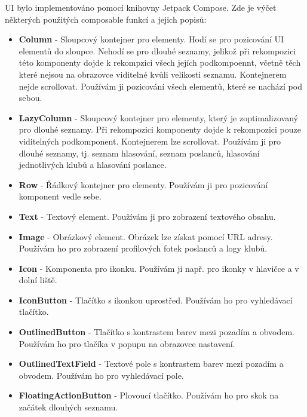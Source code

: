 UI bylo implementováno pomocí knihovny Jetpack Compose. Zde je výčet některých použitých composable funkcí a jejich popisů:


\begin{itemize}
	\item \textbf{Column} - Sloupcový kontejner pro elementy. Hodí se pro pozicování UI elementů do sloupce. Nehodí se pro dlouhé seznamy, jelikož při rekompozici této komponenty dojde k rekompzici všech jejích podkompoennt, včetně těch které nejsou na obrazovce viditelné kvůli velikosti seznamu. Kontejnerem nejde scrollovat. Používám ji pozicování všech elementů, které se nachází pod sebou.

	\item \textbf{LazyColumn} - Sloupcový kontejner pro elementy, který je zoptimalizovaný pro dlouhé seznamy. Při rekompozici komponenty dojde k rekompozici pouze viditelných podkomponent. Kontejnerem lze scrollovat. Používám ji pro dlouhé seznamy, tj. seznam hlasování, seznam poslanců, hlasování jednotlivých klubů a hlasování poslance.

	\item \textbf{Row} - Řádkový kontejner pro elementy. Používám ji pro pozicování komponent vedle sebe.

	\item \textbf{Text} - Textový element. Používám ji pro zobrazení textového obsahu.

	\item \textbf{Image} - Obrázkový element. Obrázek lze získat pomocí URL adresy. Používám ho pro zobrazení profilových fotek poslanců a logy klubů.

	\item \textbf{Icon} - Komponenta pro ikonku. Používám ji např. pro ikonky v hlavičce a v dolní liště.

	\item \textbf{IconButton} - Tlačítko s ikonkou uprostřed. Používám ho pro vyhledávací tlačítko.

	\item \textbf{OutlinedButton} - Tlačítko s kontrastem barev mezi pozadím a obvodem. Používám ho pro tlačíka v popupu na obrazovce nastavení.

	\item \textbf{OutlinedTextField} - Textové pole s kontrastem barev mezi pozadím a obvodem. Používám ho pro vyhledávací pole.

	\item \textbf{FloatingActionButton} - Plovoucí tlačítko. Používám ho pro skok na začátek dlouhých seznamu.


\end{itemize}
